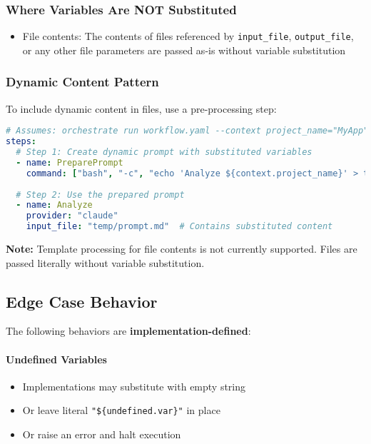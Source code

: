\documentclass[11pt,a4paper]{article}
\begin{document}
\subsubsection{Where Variables Are NOT Substituted}
\begin{itemize}
    \item File contents: The contents of files referenced by \texttt{input\_file}, \texttt{output\_file}, or any other file parameters are passed as-is without variable substitution
\end{itemize}

\subsubsection{Dynamic Content Pattern}

To include dynamic content in files, use a pre-processing step:

\begin{lstlisting}[language=yaml, caption={Dynamic Content Pattern}]
# Assumes: orchestrate run workflow.yaml --context project_name="MyApp"
steps:
  # Step 1: Create dynamic prompt with substituted variables
  - name: PreparePrompt
    command: ["bash", "-c", "echo 'Analyze ${context.project_name}' > temp/prompt.md"]
    
  # Step 2: Use the prepared prompt
  - name: Analyze
    provider: "claude"
    input_file: "temp/prompt.md"  # Contains substituted content
\end{lstlisting}

\textbf{Note:} Template processing for file contents is not currently supported. Files are passed literally without variable substitution.

\subsection{Edge Case Behavior}

The following behaviors are \textbf{implementation-defined}:

\paragraph{Undefined Variables}
\begin{itemize}
    \item Implementations may substitute with empty string
    \item Or leave literal \texttt{"\$\{undefined.var\}"} in place
    \item Or raise an error and halt execution
\end{itemize}
\end{document}
